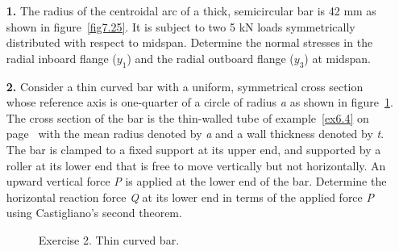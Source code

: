 \documentclass{AeroStructure-ERJohnson}
\begin{document}
\begin{exercise}
\begin{enumerate}[\textbf{2.}]
\item[\textbf{1.}] The radius of the centroidal arc of a thick, semicircular bar is 42 mm as shown in figure~\ref{fig7.25}. It is subject to two 5 kN loads symmetrically distributed with respect to midspan. Determine the normal stresses in the radial inboard flange ($y_{1}$) and the radial outboard flange ($y_{3}$) at midspan.

\vspace*{-5pt}

{\def\thefigure{7.25}
}

\vspace*{-10pt}

\item[\textbf{2.}] Consider a thin curved bar with a uniform, symmetrical cross section whose reference axis is one-quarter of a circle of radius \textit{a} as shown in figure~\ref{fig7.26}. The cross section of the bar is the thin-walled tube of example~\ref{ex6.4} on page~\pageref{ex6.4} with the mean radius denoted by \textit{a} and a wall thickness denoted by \textit{t}. The bar is clamped to a fixed support at its upper end, and supported by a roller at its lower end that is free to move vertically but not horizontally. An upward vertical force \textit{P} is applied at the lower end of the bar. Determine the horizontal reaction force \textit{Q} at its lower end in terms of the applied force \textit{P} using Castigliano's second theorem.

{\def\thefigure{7.26}
\begin{figure}[h]\vspace*{-5pt}
\caption{Exercise 2. Thin curved bar.\label{fig7.26}}\vspace*{-8pt}
\end{figure}
}



\end{enumerate}
\end{exercise}
\end{document}
